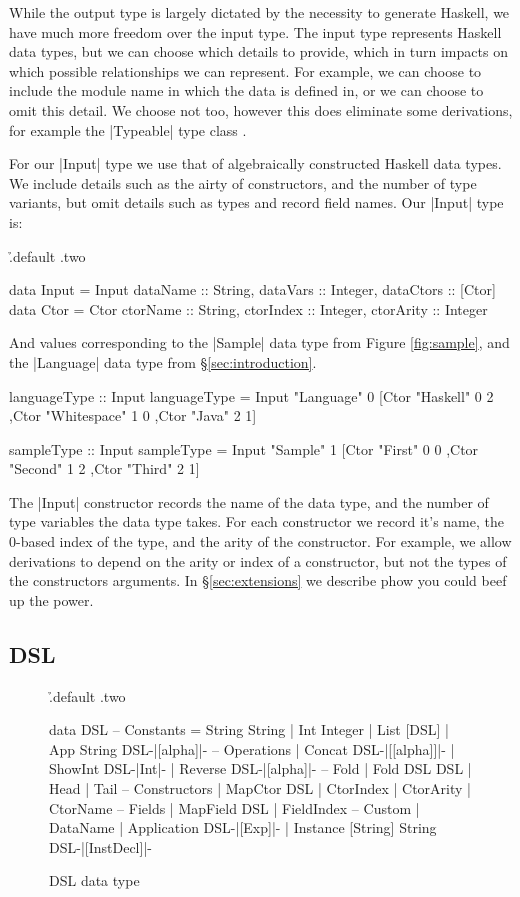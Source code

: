 \documentclass[preprint,draft]{sigplanconf}
\begin{document}
While the output type is largely dictated by the necessity to generate Haskell, we have much more freedom over the input type. The input type represents Haskell data types, but we can choose which details to provide, which in turn impacts on which possible relationships we can represent. For example, we can choose to include the module name in which the data is defined in, or we can choose to omit this detail. We choose not too, however this does eliminate some derivations, for example the |Typeable| type class \cite{lammel:syb}.

For our |Input| type we use that of algebraically constructed Haskell data types. We include details such as the airty of constructors, and the number of type variants, but omit details such as types and record field names. Our |Input| type is:

\h{.default .two}\begin{code}
data Input = Input
    {dataName :: String, dataVars :: Integer, dataCtors :: [Ctor]}
data Ctor = Ctor
    {ctorName :: String, ctorIndex :: Integer, ctorArity :: Integer}
\end{code}

And values corresponding to the |Sample| data type from Figure \ref{fig:sample}, and the |Language| data type from \S\ref{sec:introduction}.

\begin{code}
languageType :: Input
languageType = Input "Language" 0
    [Ctor "Haskell" 0 2
    ,Ctor "Whitespace" 1 0
    ,Ctor "Java" 2 1]

sampleType :: Input
sampleType = Input "Sample" 1
    [Ctor "First" 0 0
    ,Ctor "Second" 1 2
    ,Ctor "Third" 2 1]
\end{code}

The |Input| constructor records the name of the data type, and the number of type variables the data type takes. For each constructor we record it's name, the 0-based index of the type, and the arity of the constructor. For example, we allow derivations to depend on the arity or index of a constructor, but not the types of the constructors arguments. In \S\ref{sec:extensions} we describe phow you could beef up the power.

\subsection{DSL}

\begin{figure}
\h{.default .two}\begin{code}
data DSL
    -- Constants
    = String String
    | Int Integer
    | List [DSL]
    | App String DSL{-|[alpha]|-}
    -- Operations
    | Concat DSL{-|[[alpha]]|-}
    | ShowInt DSL{-|Int|-}
    | Reverse DSL{-|[alpha]|-}
    -- Fold
    | Fold DSL DSL
    | Head
    | Tail
    -- Constructors
    | MapCtor DSL
    | CtorIndex
    | CtorArity
    | CtorName
    -- Fields
    | MapField DSL
    | FieldIndex
    -- Custom
    | DataName
    | Application DSL{-|[Exp]|-}
    | Instance [String] String DSL{-|[InstDecl]|-}
\end{code}
\caption{DSL data type}
\label{fig:dsl}
\end{figure}
\end{document}
